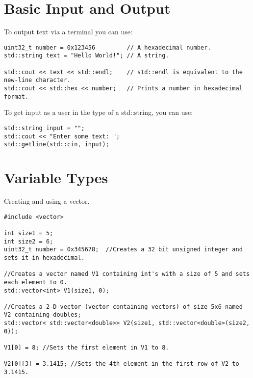 \section{Basic Input and Output}
To output text via a terminal you can use:
\begin{lstlisting}
uint32_t number = 0x123456         // A hexadecimal number.
std::string text = "Hello World!"; // A string.

std::cout << text << std::endl;    // std::endl is equivalent to the new-line character.
std::cout << std::hex << number;   // Prints a number in hexadecimal format.
\end{lstlisting}

To get input as a user in the type of a std::string, you can use:
\begin{lstlisting}
std::string input = "";
std::cout << "Enter some text: ";
std::getline(std::cin, input);
\end{lstlisting}






\section{Variable Types}

Creating and using a vector.
\begin{lstlisting}
#include <vector>

int size1 = 5;
int size2 = 6;
uint32_t number = 0x345678;  //Creates a 32 bit unsigned integer and sets it in hexadecimal.

//Creates a vector named V1 containing int's with a size of 5 and sets each element to 0. 
std::vector<int> V1(size1, 0); 

//Creates a 2-D vector (vector containing vectors) of size 5x6 named V2 containing doubles;
std::vector< std::vector<double>> V2(size1, std::vector<double>(size2, 0)); 

V1[0] = 8; //Sets the first element in V1 to 8.

V2[0][3] = 3.1415; //Sets the 4th element in the first row of V2 to 3.1415.
\end{lstlisting}






